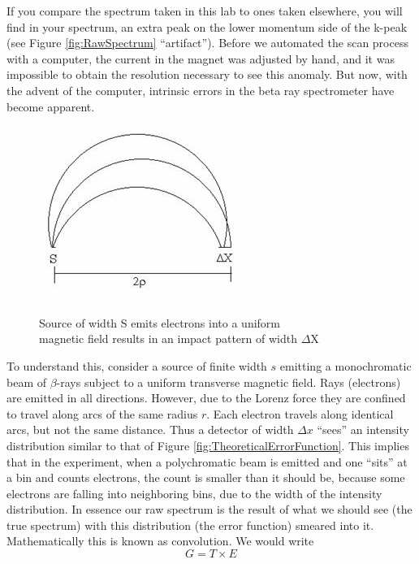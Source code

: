 \documentclass{../lab}
\begin{document}
If you compare the spectrum taken in this lab to ones taken elsewhere, you will find in your spectrum, an extra peak on the lower momentum side of the k-peak (see Figure \ref{fig:RawSpectrum} ``artifact''). Before we automated the scan process with a computer, the current in the magnet was adjusted by hand, and it was impossible to obtain the resolution necessary to see this anomaly. But now, with the advent of the computer, intrinsic errors in the beta ray spectrometer have become apparent.

\begin{figure}[h]
\captionsetup{justification=centering}
    \centering
    \href{http://experimentationlab.berkeley.edu/sites/default/files/images/BRAimage039.jpg}{\includegraphics[width=0.5\linewidth]{images/BRAimage039.jpg}}
    \caption{Source of width S emits electrons into a uniform \\magnetic field results in an impact pattern of width $\Delta$X}
    \label{fig:BRAimage039}
\end{figure}

To understand this, consider a source of finite width $s$ emitting a monochromatic beam of $\beta$-rays subject to a uniform transverse magnetic field. Rays (electrons) are emitted in all directions. However, due to the Lorenz force they are confined to travel along arcs of the same radius $r$. Each electron travels along identical arcs, but not the same distance. Thus a detector of width $\Delta x$ ``sees'' an intensity distribution similar to that of Figure \ref{fig:TheoreticalErrorFunction}. This implies that in the experiment, when a polychromatic beam is emitted and one ``sits'' at a bin and counts electrons, the count is smaller than it should be, because some electrons are falling into neighboring bins, due to the width of the intensity distribution. In essence our raw spectrum is the result of what we should see (the true spectrum) with this distribution (the error function) smeared into it. Mathematically this is known as convolution. We would write
\[
G = T \times E
\]
\end{document}
